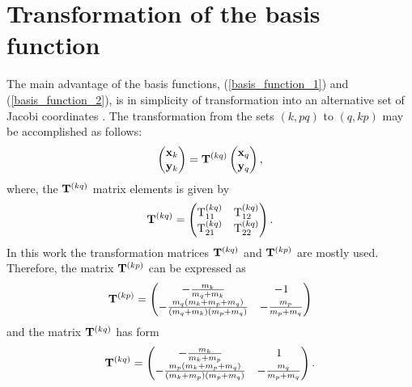\documentclass[
12pt, %
oneside, %
english, %
onehalfspacing, %
onehalfspacing, %
headsepline, %
]{MastersDoctoralThesis} %
\begin{document}
 \section{Transformation of the basis function }
The main advantage of the basis functions,  (\ref{basis_function_1}) and (\ref{basis_function_2}), is in simplicity of transformation into an alternative set of Jacobi coordinates \cite{suzuki1998stochastic}.
The transformation from the sets $(k,pq)$ to $(q,kp)$ may be accomplished as follows:
\begin{equation}
\begin{pmatrix}
{\bf x}_k \\ 
{\bf y}_k
\end{pmatrix}  = {\bf T}^{(kq)}
\begin{pmatrix}
{\bf x}_q \\ 
{\bf y}_q
\end{pmatrix},
\end{equation}
where, the ${\bf T}^{(kq)}$ matrix elements is given by  
\begin{equation}
{\bf T}^{(kq)} = 
 \begin{pmatrix}
 {\rm T}^{(kq)}_{11} & {\rm T}^{(kq)}_{12} \\
 {\rm T}^{(kq)}_{21}  &  {\rm T}^{(kq)}_{22}
 \end{pmatrix}.
\end{equation}
In this work the transformation matrices ${\bf T}^{(kq)}$ and ${\bf T}^{(kp)}$ are mostly used. Therefore, the matrix ${\bf T}^{(kp)}$ can be expressed as
\begin{equation}
{\bf T}^{(kp)} = 
 \begin{pmatrix}
 -\tfrac{m_k}{m_q+m_k} & -1 \\
-\tfrac{m_q(m_k+m_p+m_q)}{(m_q+m_k)(m_p+m_q)}  & -\tfrac{m_p}{m_p+m_q}
 \end{pmatrix}
\end{equation}
 and the matrix ${\bf T}^{(kq)}$ has form
 \begin{equation}
{\bf T}^{(kq)} = 
 \begin{pmatrix}
 -\tfrac{m_k}{m_k+m_p} & 1 \\
-\tfrac{m_p(m_k+m_p+m_q)}{(m_k+m_p)(m_p+m_q)}  & -\tfrac{m_q}{m_p+m_q}
 \end{pmatrix}.
\end{equation}
\end{document}

